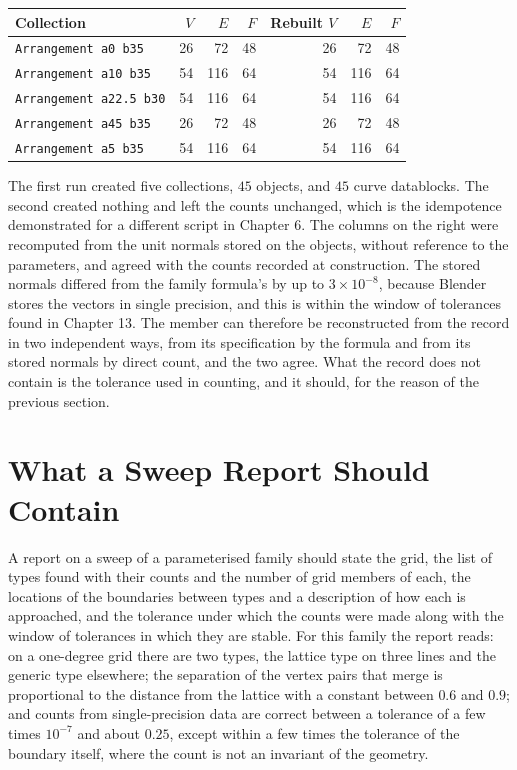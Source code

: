 \begin{center}
\begin{tabular}{lrrrrrr}
\toprule
Collection & $V$ & $E$ & $F$ & Rebuilt $V$ & $E$ & $F$\\
\midrule
\texttt{Arrangement a0 b35} & 26 & 72 & 48 & 26 & 72 & 48\\
\texttt{Arrangement a10 b35} & 54 & 116 & 64 & 54 & 116 & 64\\
\texttt{Arrangement a22.5 b30} & 54 & 116 & 64 & 54 & 116 & 64\\
\texttt{Arrangement a45 b35} & 26 & 72 & 48 & 26 & 72 & 48\\
\texttt{Arrangement a5 b35} & 54 & 116 & 64 & 54 & 116 & 64\\
\bottomrule
\end{tabular}
\end{center}

The first run created five collections, $45$ objects, and $45$ curve datablocks. The second created nothing and left the counts unchanged, which is the idempotence demonstrated for a different script in Chapter 6. The columns on the right were recomputed from the unit normals stored on the objects, without reference to the parameters, and agreed with the counts recorded at construction. The stored normals differed from the family formula's by up to $3\times10^{-8}$, because Blender stores the vectors in single precision, and this is within the window of tolerances found in Chapter 13. The member can therefore be reconstructed from the record in two independent ways, from its specification by the formula and from its stored normals by direct count, and the two agree. What the record does not contain is the tolerance used in counting, and it should, for the reason of the previous section.

\section{What a Sweep Report Should Contain}

A report on a sweep of a parameterised family should state the grid, the list of types found with their counts and the number of grid members of each, the locations of the boundaries between types and a description of how each is approached, and the tolerance under which the counts were made along with the window of tolerances in which they are stable. For this family the report reads: on a one-degree grid there are two types, the lattice type on three lines and the generic type elsewhere; the separation of the vertex pairs that merge is proportional to the distance from the lattice with a constant between $0.6$ and $0.9$; and counts from single-precision data are correct between a tolerance of a few times $10^{-7}$ and about $0.25$, except within a few times the tolerance of the boundary itself, where the count is not an invariant of the geometry.

